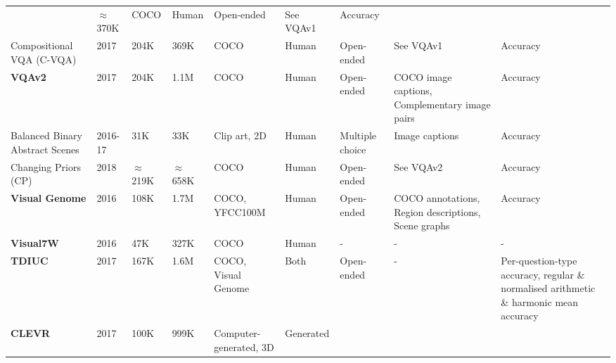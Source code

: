 \begin{center}
\begin{xltabular}{\textwidth}{LLLLLLLLL}
  & {\color{red}\(\approx\)370K}  %
  & COCO
  & Human
  & Open-ended
  & See VQAv1
  & Accuracy\footnotemark[\value{footnote}] \\
  Compositional VQA (C-VQA) \cite{agrawal2017cvqa}
  & 2017
  & 204K  %
  & 369K  %
  & COCO
  & Human
  & Open-ended
  & See VQAv1
  & Accuracy\footnotemark[\value{footnote}] \\
  \textbf{VQAv2} \cite{goyal2017making}
  & 2017
  & 204K  %
  & 1.1M  %
  & COCO
  & Human
  & Open-ended
  & COCO image captions, Complementary image pairs
  & Accuracy\footnotemark[\value{footnote}] \\
  Balanced Binary Abstract Scenes \cite{zhang2016yin}
  & 2016-17
  & 31K %
  & 33K %
  & Clip art, 2D
  & Human
  & Multiple choice
  & Image captions
  & Accuracy\footnotemark[\value{footnote}] \\
  Changing Priors (CP) \cite{agrawal2018dont}
  & 2018
  & {\color{red}\(\approx\)219K}  %
  & {\color{red}\(\approx\)658K}  %
  & COCO
  & Human
  & Open-ended
  & See VQAv2
  & Accuracy\footnotemark[\value{footnote}] \\
  \textbf{Visual Genome} \cite{krishna2017visual}
  & 2016
  & 108K  %
  & 1.7M  %
  & COCO, YFCC100M \cite{thomee2016yfcc100m}
  & Human
  & Open-ended
  & COCO annotations, Region descriptions, Scene graphs
  & Accuracy \\
  \textbf{Visual7W} \cite{zhu2016visual7w}
  & 2016
  & 47K %
  & 327K %
  & COCO
  & Human
  & -
  & - %
  & - \\
  \textbf{TDIUC} \cite{kafle2017analysis}
  & 2017
  & 167K %
  & 1.6M %
  & COCO, Visual Genome
  & Both
  & Open-ended
  & -
  & Per-question-type accuracy, regular \& normalised arithmetic \& harmonic mean accuracy\\
  \textbf{CLEVR} \cite{johnson2017clevr}
  & 2017
  & 100K  %
  & 999K  %
  & Computer-generated, 3D
  & Generated

\end{xltabular}
\end{center}
